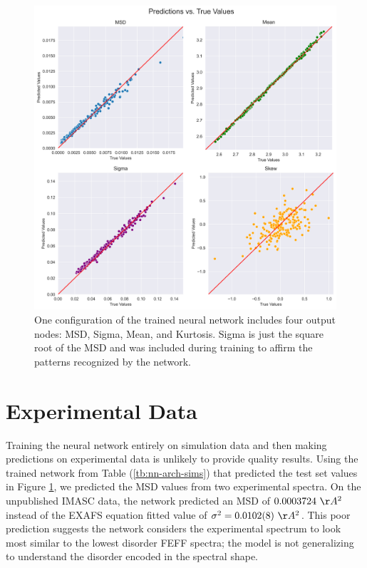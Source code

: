 \begin{figure}
    \centering
    \includegraphics[width=\linewidth]{Chapters/Figures/pa_train-test-fixed.png}
    \caption{One configuration of the trained neural network includes four output nodes: MSD, Sigma, Mean, and Kurtosis. Sigma is just the square root of the MSD and was included during training to affirm the patterns recognized by the network.}
    \label{fig:train-test-split-all4}
\end{figure}

\section{Experimental Data} \label{ch:results}

Training the neural network entirely on simulation data and then making predictions on experimental data is unlikely to provide quality results. Using the trained network from Table (\ref{tb:nn-arch-sims}) that predicted the test set values in Figure \ref{fig:train-test-split-all4}, we predicted the MSD values from two experimental spectra. On the unpublished IMASC data, the network predicted an MSD of $0.0003724~\AA^2$ instead of the EXAFS equation fitted value of ${\sigma^2=0.0102(8)~\AA^2}$. This poor prediction suggests the network considers the experimental spectrum to look most similar to the lowest disorder FEFF spectra; the model is not generalizing to understand the disorder encoded in the spectral shape.


